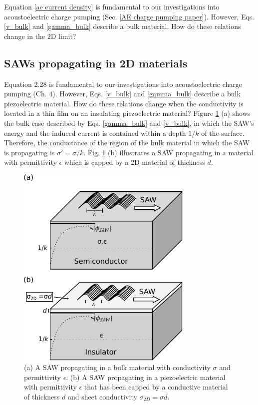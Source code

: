 \documentclass[double,12pt,1in]{beavtex}
\begin{document}
Equation \ref{ae current density} is fundamental to our investigations into acoustoelectric charge pumping (Sec. \ref{AE charge pumping paper}). However, Eqs. \ref{v_bulk} and \ref{gamma_bulk} describe a bulk material. How do these relations change in the 2D limit? 

\subsection{SAWs propagating in 2D materials}

Equation 2.28 is fundamental to our investigations into acoustoelectric charge pumping
(Ch. 4). However, Eqs. \ref{v_bulk} and \ref{gamma_bulk} describe a bulk piezoelectric material. How do these relations change when the conductivity is located in a thin film on an insulating piezoelectric material? Figure \ref{SAW in thin film} (a) shows the bulk case described by Eqs. \ref{gamma_bulk} and \ref{v_bulk}, in which the SAW's energy and the induced current is contained within a depth $1/k$ of the surface. Therefore, the conductance of the region of the bulk material in which the SAW is propagating is $\sigma' = \sigma/k$. Fig. \ref{SAW in thin film} (b) illustrates a SAW propagating in a material with permittivity $\epsilon$ which is capped by a 2D material of thickness $d$. 

\begin{figure}
    \includegraphics[width = 0.75\textwidth]{SAW in thin film.pdf}
    \caption{(a) A SAW propagating in a bulk material with conductivity $\sigma$ and permittivity $\epsilon$. (b) A SAW propagating in a piezoelectric material with permittivity $\epsilon$ that has been capped by a conductive material of thickness $d$ and sheet conductivity $\sigma_{2D} = \sigma d$.}
    \label{SAW in thin film}
\end{figure}
\end{document}
